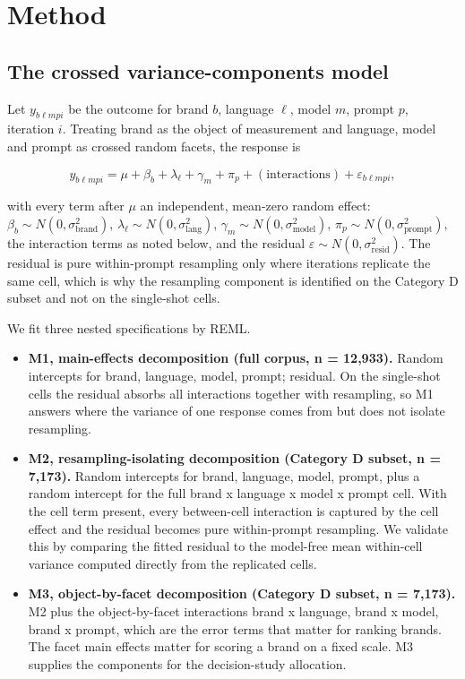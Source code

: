 \documentclass[pdflatex,sn-mathphys-num]{sn-jnl}
\begin{document}
\section{Method}\label{method}

\subsection{The crossed variance-components model}\label{the-crossed-variance-components-model}

Let \(y_{b\ell m p i}\) be the outcome for brand \(b\), language \(\ell\), model \(m\), prompt \(p\), iteration \(i\). Treating brand as the object of measurement and language, model and prompt as crossed random facets, the response is

\[
y_{b\ell m p i} = \mu + \beta_b + \lambda_\ell + \gamma_m + \pi_p + (\text{interactions}) + \varepsilon_{b\ell m p i},
\]

with every term after \(\mu\) an independent, mean-zero random effect: \(\beta_b \sim N(0,\sigma^2_{\text{brand}})\), \(\lambda_\ell \sim N(0,\sigma^2_{\text{lang}})\), \(\gamma_m \sim N(0,\sigma^2_{\text{model}})\), \(\pi_p \sim N(0,\sigma^2_{\text{prompt}})\), the interaction terms as noted below, and the residual \(\varepsilon \sim N(0,\sigma^2_{\text{resid}})\). The residual is pure within-prompt resampling only where iterations replicate the same cell, which is why the resampling component is identified on the Category D subset and not on the single-shot cells.

We fit three nested specifications by REML.

\begin{itemize}
\item
  \textbf{M1, main-effects decomposition (full corpus, n = 12,933).} Random intercepts for brand, language, model, prompt; residual. On the single-shot cells the residual absorbs all interactions together with resampling, so M1 answers where the variance of one response comes from but does not isolate resampling.
\item
  \textbf{M2, resampling-isolating decomposition (Category D subset, n = 7,173).} Random intercepts for brand, language, model, prompt, plus a random intercept for the full brand x language x model x prompt cell. With the cell term present, every between-cell interaction is captured by the cell effect and the residual becomes pure within-prompt resampling. We validate this by comparing the fitted residual to the model-free mean within-cell variance computed directly from the replicated cells.
\item
  \textbf{M3, object-by-facet decomposition (Category D subset, n = 7,173).} M2 plus the object-by-facet interactions brand x language, brand x model, brand x prompt, which are the error terms that matter for ranking brands. The facet main effects matter for scoring a brand on a fixed scale. M3 supplies the components for the decision-study allocation.
\end{itemize}
\end{document}

